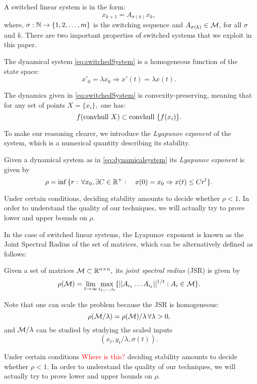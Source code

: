 A switched linear system is in the form:
\begin{equation}\label{eq:switchedSystem}x_{k+1} = A_{\sigma(k)}x_k,\end{equation}
where, $\sigma: \mathbb{N} \to \{1,2, \ldots, m\}$ is the switching sequence and $A_{\sigma(k)} \in \mathcal{M}$, for all $\sigma$ and $k$. There are two important properties of switched systems that we exploit in this paper.
\begin{property}\label{property:homogeneity}
The dynamical system \eqref{eq:switchedSystem} is a homogeneous function of the state space:
$$x'_0=\lambda x_0 \Rightarrow x'(t)=\lambda x(t). $$
\end{property}
\begin{property}\label{property:convpres}
The dynamics given in \eqref{eq:switchedSystem} is convexity-preserving, meaning that for any set of points $X=\{x_i\},$ one has:
$$ f(\mbox{convhull }{X})\subset \mbox{convhull }\{f(x_i)\}. $$
\end{property}

To make our reasoning clearer, we introduce the \emph{Lyapunov exponent} of the system, which is a numerical quantity describing its stability.
\begin{definition}   Given a dynamical system as in \eqref{eq:dynamicalsystem} its \emph{Lyapunov exponent} is given by
$$\rho =\inf{\{r:\,\forall x_0, \exists C\in \mathbb{R}^+: \quad x(0)=x_0 \Rightarrow x(t)\leq Cr^t\}}. $$
\end{definition}
Under certain conditions, deciding stability amounts to decide whether $\rho<1.$  In order to understand the quality of our techniques, we will actually try to prove lower and upper bounds on $\rho.$ 

In the case of switched linear systems, the Lyapunov exponent is known as the Joint Spectral Radius of the set of matrices, which can be alternatively defined as follows:
\begin{definition}  \cite{jungers_lncis} Given a set of matrices $\mathcal{M} \subset \mathbb{R}^{n\times n},$ its \emph{joint spectral radius} (JSR) is given by
$$\rho(\mathcal{M}) =\lim_{t\rightarrow \infty} \max_{i_1,\dots, i_t}\{||A_{i_1} \dots A_{i_t}||^{1/t}: A_i\in\mathcal{M}\}. $$
\end{definition}

\begin{remark}\label{rem:scaling}
 Note that one can scale the problem because the JSR is homogeneous:
$$\rho(\mathcal{M}/\lambda)=\rho(\mathcal{M})/\lambda\, \forall \lambda>0, $$ and $\mathcal{M}/\lambda$ can be studied by studying the scaled inputs $$(x_t, y_t/\lambda,\sigma(t)).$$
\end{remark}

Under certain conditions \textcolor{red}{Where is this?} deciding stability amounts to decide whether $\rho<1.$  In order to understand the quality of our techniques, we will actually try to prove lower and upper bounds on $\rho.$ 